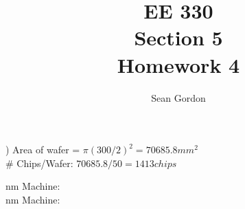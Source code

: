 \documentclass[12pt]{article}
\title{EE 330\\Section 5\\Homework 4}
\author{Sean Gordon}
\begin{document}
\maketitle

) Area of wafer = $\pi (300/2)^2 = 70685.8mm^2$\\
\# Chips/Wafer: $70685.8/50 = 1413 chips$
\begin{multicols}{2}

 nm Machine:\\


 nm Machine:\\


\end{multicols}
\end{document}
